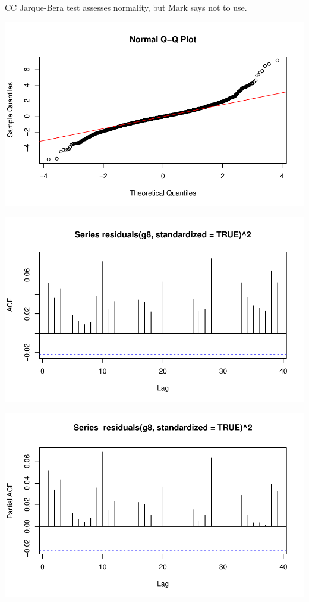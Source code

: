\documentclass[11pt]{article}\usepackage[]{graphicx}\usepackage[]{color}
\makeatletter
\def\maxwidth{ %
  \ifdim\Gin@nat@width>\linewidth
    \linewidth
  \else
    \Gin@nat@width
  \fi
}
\newenvironment{knitrout}{}{} %
\makeatother
\begin{document}
CC Jarque-Bera test assesses normality, but Mark says not to use.
\begin{knitrout}\footnotesize
{}\color{fgcolor}

{\centering \includegraphics[width=\maxwidth]{figure/checking_assump-1} 

}




{\centering \includegraphics[width=\maxwidth]{figure/checking_assump-2} 

}




{\centering \includegraphics[width=\maxwidth]{figure/checking_assump-3} 

}



\end{knitrout}
\end{document}
